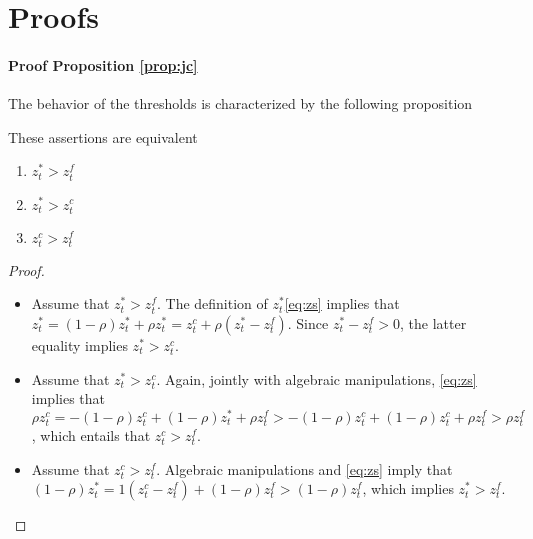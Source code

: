 \section{Proofs} \label{app:proofs}

\paragraph{Proof Proposition \ref{prop:jc}}

The behavior of the thresholds is characterized by the following proposition

\begin{lemma}\label{lemma:thresholds}
These assertions are equivalent
\begin{enumerate}
\item $z_t^* > z_t^f$
\item $z_t^* > z_t^c$
\item $z_t^c > z_t^f$
\end{enumerate}
\end{lemma}
\begin{proof}
\begin{itemize}
\item Assume that $z_t^*>z_t^f$. The definition of $z_t^*$\eqref{eq:zs} implies that $z_t^* = \left( 1 - \rho \right) z_t^* + \rho z_t^* = z_t^c + \rho \left( z_t^* - z_t^f\right)$. Since $z_t^* - z_t^f > 0$, the latter equality implies $z_t^* > z_t^c$.
\item Assume that $z_t^*>z_t^c$. Again, jointly with algebraic manipulations, \eqref{eq:zs} implies that\\
$\rho z_t^c = - \left( 1 - \rho \right) z_t^c + (1 - \rho) z_t^* + \rho z_t^f > - \left( 1 - \rho \right) z_t^c + (1 - \rho) z_t^c + \rho z_t^f > \rho z_t^f$, which entails that $z_t^c > z_t^f$.
\item Assume that $z_t^c > z_t^f$. Algebraic manipulations and \eqref{eq:zs} imply that\\
$\left(1-\rho\right) z_t^* = 1 \left( z_t^c - z_t^f \right) + \left( 1 - \rho \right) z_t^f > \left( 1 - \rho \right) z_t^f$, which implies $z_t^* > z_t^f$. \qedsymbol
\end{itemize}
\end{proof}

